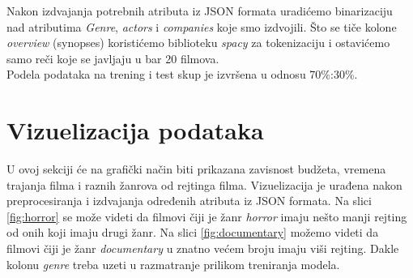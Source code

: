 \documentclass[a4paper]{article}
\begin{document}
Nakon izdvajanja potrebnih atributa iz JSON formata uradićemo binarizaciju nad atributima \textit{Genre}, \textit{actors} i \textit{companies} koje smo izdvojili.
Što se tiče kolone \textit{overview} (synopses) koristićemo biblioteku \textit{spacy} \cite{spacy} za tokenizaciju i ostavićemo samo reči koje se javljaju u bar 20 filmova.\\

Podela podataka na trening i test skup je izvršena u odnosu 70\%:30\%.\\

\section{Vizuelizacija podataka}
\label{sec:vizuelizacija}
U ovoj sekciji će na grafički način biti prikazana zavisnost budžeta, vremena trajanja filma i raznih žanrova od rejtinga filma. Vizuelizacija je urađena nakon preprocesiranja i izdvajanja određenih atributa iz JSON formata. Na slici \ref{fig:horror} se može videti da filmovi čiji je žanr \textit{horror} imaju nešto manji rejting od onih koji imaju drugi žanr. Na slici  \ref{fig:documentary} možemo videti da filmovi čiji je žanr \textit{documentary} u znatno većem broju imaju viši rejting. Dakle kolonu \textit{genre} treba uzeti u razmatranje prilikom treniranja modela.
\end{document}
